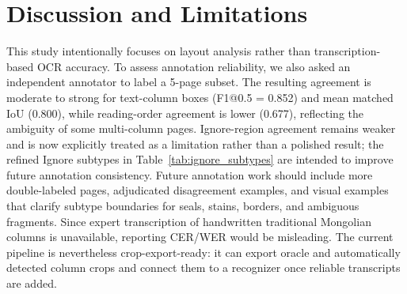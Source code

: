 \documentclass[pdflatex,sn-mathphys-num]{sn-jnl}
\begin{document}
\section{Discussion and Limitations}
\label{sec:discussion}
This study intentionally focuses on layout analysis rather than transcription-based OCR accuracy. To assess annotation reliability, we also asked an independent annotator to label a 5-page subset. The resulting agreement is moderate to strong for text-column boxes (F1@0.5 = 0.852) and mean matched IoU (0.800), while reading-order agreement is lower (0.677), reflecting the ambiguity of some multi-column pages. Ignore-region agreement remains weaker and is now explicitly treated as a limitation rather than a polished result; the refined Ignore subtypes in Table~\ref{tab:ignore_subtypes} are intended to improve future annotation consistency. Future annotation work should include more double-labeled pages, adjudicated disagreement examples, and visual examples that clarify subtype boundaries for seals, stains, borders, and ambiguous fragments. Since expert transcription of handwritten traditional Mongolian columns is unavailable, reporting CER/WER would be misleading. The current pipeline is nevertheless crop-export-ready: it can export oracle and automatically detected column crops and connect them to a recognizer once reliable transcripts are added.
\end{document}
